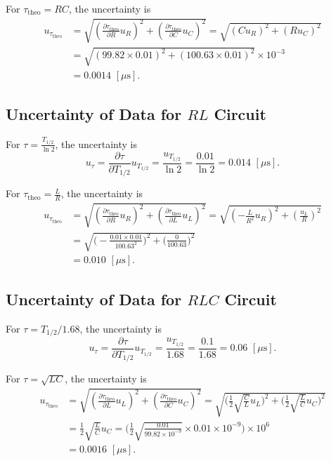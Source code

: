 \documentclass{article}
\begin{document}
For $\tau_{\text{theo}} = RC$, the uncertainty is
\begin{align*}
    u_{\tau_{\text{theo}}} & = \sqrt{(\frac{\partial \tau_{\text{theo}}}{\partial R}u_R)^2+(\frac{\partial \tau_{\text{theo}}}{\partial C}u_C)^2} = \sqrt{(Cu_R)^2 + (Ru_C)^2} \\
                           & = \sqrt{(99.82\times0.01)^2 + (100.63\times0.01)^2} \times 10^{-3}                                                                                \\
                           & = 0.0014\,\,[\mu\text{s}].
\end{align*}

\subsection{Uncertainty of Data for $RL$ Circuit}
For $\tau = \frac{T_{1/2}}{\ln 2}$, the uncertainty is
$$u_\tau = \frac{\partial \tau}{\partial T_{1/2}}u_{T_{1/2}} = \frac{u_{T_{1/2}}}{\ln 2} = \frac{0.01}{\ln 2} = 0.014\,\,[\mu\text{s}].$$

For $\tau_{\text{theo}} = \frac{L}{R}$, the uncertainty is
\begin{align*}
    u_{\tau_{\text{theo}}} & = \sqrt{(\frac{\partial \tau_{\text{theo}}}{\partial R}u_R)^2+(\frac{\partial \tau_{\text{theo}}}{\partial L}u_L)^2} = \sqrt{(-\frac{L}{R^2}u_R)^2 + (\frac{u_L}{R})^2} \\
                           & = \sqrt{\bigg(-\frac{0.01\times0.01}{100.63^2}\bigg)^2 + \bigg(\frac{0}{100.63}\bigg)^2}                                                                                \\
                           & = 0.010\,\,[\mu\text{s}].
\end{align*}

\subsection{Uncertainty of Data for $RLC$ Circuit}
For $\tau = T_{1/2}/1.68$, the uncertainty is
$$u_\tau = \frac{\partial \tau}{\partial T_{1/2}}u_{T_{1/2}} = \frac{u_{T_{1/2}}}{1.68} = \frac{0.1}{1.68} = 0.06\,\,[\mu\text{s}].$$

For $\tau = \sqrt{LC}$, the uncertainty is
\begin{align*}
    u_{\tau_{\text{theo}}} & = \sqrt{(\frac{\partial \tau_{\text{theo}}}{\partial L}u_L)^2 + (\frac{\partial \tau_{\text{theo}}}{\partial C}u_C)^2} = \sqrt{\bigg(\frac{1}{2}\sqrt{\frac{C}{L}}u_L\bigg)^2 + \bigg(\frac{1}{2}\sqrt{\frac{L}{C}}u_C\bigg)^2} \\
                           & = \frac{1}{2}\sqrt{\frac{L}{C}}u_C = \bigg(\frac{1}{2}\sqrt{\frac{0.01}{99.82\times10^{-9}}}\times 0.01 \times 10^{-9}\bigg) \times 10^{6}                                                                                      \\
                           & = 0.0016\,\,[\mu\text{s}].
\end{align*}
\end{document}
